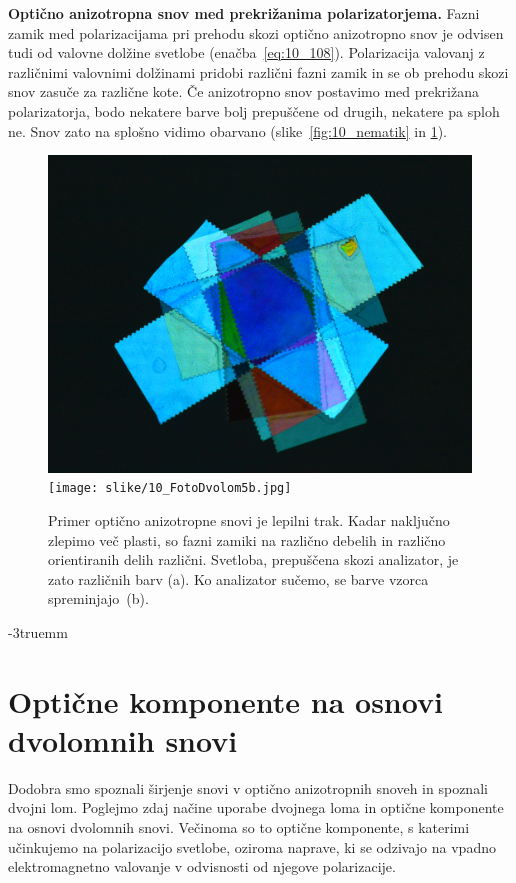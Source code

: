 \begin{example}{\bf Optično anizotropna snov med prekrižanima polarizatorjema.}
Fazni zamik med polarizacijama pri prehodu skozi optično anizotropno snov je 
odvisen tudi od valovne dolžine svetlobe (enačba~\ref{eq:10_108}). 
Polarizacija valovanj z različnimi valovnimi dolžinami pridobi različni fazni zamik in se 
ob prehodu skozi snov zasuče za različne kote. Če anizotropno snov 
postavimo med prekrižana polarizatorja, bodo nekatere barve bolj prepuščene
od drugih, nekatere pa sploh ne. Snov zato na splošno vidimo obarvano 
(slike~\ref{fig:10_nematik} in \ref{fig:10_dvolom_5}).
\begin{figure}[ht]
\centering
\includegraphics[width=7truecm]{slike/10_FotoDvolom5a.jpg}\hfill
\texttt{[image: slike/10\_FotoDvolom5b.jpg]}
\caption{Primer optično anizotropne snovi je lepilni trak. Kadar naključno zlepimo več 
plasti, so fazni zamiki na različno debelih in različno orientiranih delih različni. 
Svetloba, prepuščena skozi analizator, je zato različnih barv (a). Ko analizator sučemo, 
se barve vzorca spreminjajo~(b).}
\label{fig:10_dvolom_5}
\end{figure}
\vglue-3truemm
\end{example}

\section{Optične komponente na osnovi dvolomnih snovi}
\label{chap:komponente}
Dodobra smo spoznali širjenje snovi v optično anizotropnih snoveh in spoznali dvojni lom.
Poglejmo zdaj načine uporabe dvojnega loma in optične komponente na osnovi dvolomnih snovi.
Večinoma so to optične komponente, s katerimi učinkujemo na polarizacijo
svetlobe, oziroma naprave, ki se odzivajo na vpadno elektromagnetno valovanje v odvisnosti
od njegove polarizacije.


